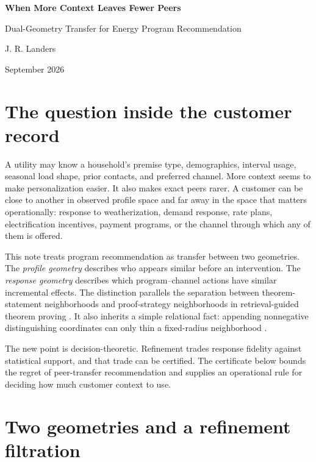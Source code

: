 \documentclass[11pt]{article}
\theoremstyle{noteplain}
\theoremstyle{definition}
\begin{document}
\begin{center}
  {\LARGE\bfseries When More Context Leaves Fewer Peers\par}
  \vspace{0.1em}
  {\Large Dual-Geometry Transfer for Energy Program Recommendation\par}
  \vspace{0.35em}
  {\large J. R. Landers\,\par}
  \vspace{0.08em}
  {\small September 2026}
\end{center}

\vspace{0.1em}
\section{The question inside the customer record}

A utility may know a household's premise type, demographics, interval usage, seasonal load shape, prior contacts, and preferred channel.  More context seems to make personalization easier.  It also makes exact peers rarer.  A customer can be close to another in observed profile space and far away in the space that matters operationally: response to weatherization, demand response, rate plans, electrification incentives, payment programs, or the channel through which any of them is offered.

This note treats program recommendation as transfer between two geometries.  The \emph{profile geometry} describes who appears similar before an intervention.  The \emph{response geometry} describes which program--channel actions have similar incremental effects.  The distinction parallels the separation between theorem-statement neighborhoods and proof-strategy neighborhoods in retrieval-guided theorem proving \cite{landerslean,yang}.  It also inherits a simple relational fact: appending nonnegative distinguishing coordinates can only thin a fixed-radius neighborhood \cite{landersshape}.

The new point is decision-theoretic.  Refinement trades response fidelity against statistical support, and that trade can be certified.  The certificate below bounds the regret of peer-transfer recommendation and supplies an operational rule for deciding how much customer context to use.

\section{Two geometries and a refinement filtration}
\end{document}
